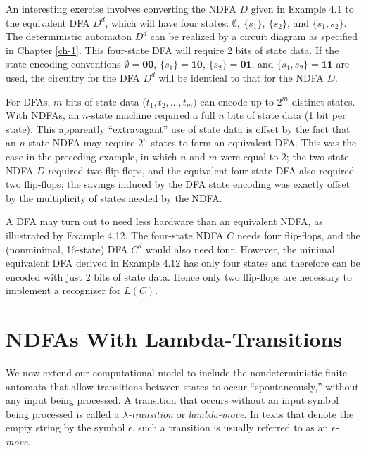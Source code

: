An interesting exercise involves converting the NDFA $D$ given in Example 4.1
to the equivalent DFA $D^d$, which will have four states: $\emptyset,\ \{s_1\},\
\{s_2\}$, and $\{s_1,s_2\}$. The deterministic automaton $D^d$ can be realized
by a circuit diagram as specified in Chapter \ref{ch-1}. This four-state DFA will require
2 bits of state data. If the state encoding conventions $\emptyset=\pmb{00}$,
$\{s_1\}=\pmb{10}$, $\{s_2\}=\pmb{01}$, and $\{s_1,s_2\}=\pmb{11}$ are used, the
circuitry for the DFA $D^d$ will be identical to that for the NDFA $D$.

For DFAs, $m$ bits of state data ($t_1,t_2, \ldots ,t_m)$ can encode up to $2^m$
distinct states. With NDFAs, an $n$-state machine required a full $n$ bits of
state data (1 bit per state). This apparently ``extravagant'' use of state data
is offset by the fact that an $n$-state NDFA may require $2^n$ states to form an
equivalent DFA. This was the case in the preceding example, in which $n$ and $m$
were equal to 2; the two-state NDFA $D$ required two flip-flops, and the
equivalent four-state DFA also required two flip-flops; the savings induced by
the DFA state encoding was exactly offset by the multiplicity of states needed
by the NDFA.

A DFA may turn out to need less hardware than an equivalent NDFA, as illustrated
by Example 4.12. The four-state NDFA $C$ needs four flip-flops, and the
(nonminimal, 16-state) DFA $C^d$ would also need four. However, the minimal
equivalent DFA derived in Example 4.12 has only four states and therefore can be
encoded with just 2 bits of state data. Hence only two flip-flops are necessary
to implement a recognizer for $L(C)$.

\section{NDFAs With Lambda-Transitions}\label{sec-4.3}

We now extend our computational model to include the nondeterministic finite
automata that allow transitions between states to occur ``spontaneously,''
without any input being processed. A transition that occurs without an input
symbol being processed is called a \emph{$\lambda$-transition} or
\emph{lambda-move}\index{lambda-move|see{$\lambda$-transition}}. In texts that denote the empty string by the symbol
$\epsilon$, such a transition is usually referred to as an
\emph{$\epsilon$-move}.

